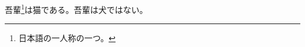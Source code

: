 \documentclass[dvipdfmx,uplatex]{jsarticle}
\begin{document}
吾輩\footnote{日本語の一人称の一つ。\label{fot:2022-08-11_21-41-39}}は猫である。吾輩は犬ではない。
\end{document}
